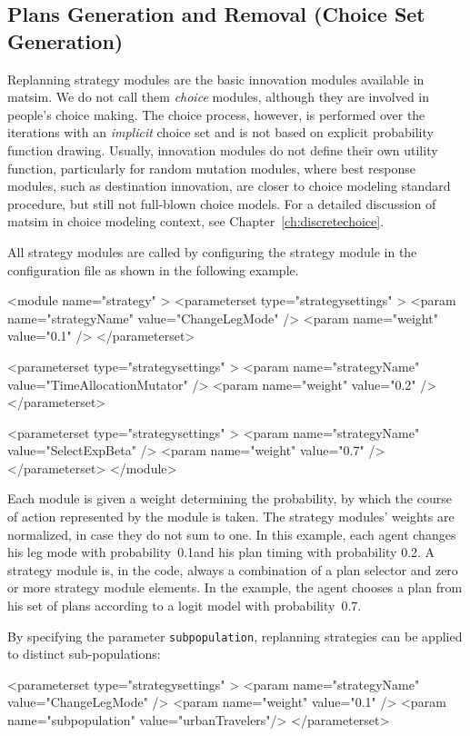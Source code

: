 \subsection{Plans Generation and Removal (Choice Set Generation)}

Replanning strategy modules are the basic innovation modules available in \gls{matsim}. We do not call them \emph{choice} modules, although they are involved in people's choice making. The choice process, however, is performed over the iterations with an \emph{implicit} choice set and is not based on explicit probability function drawing. Usually, innovation modules do not define their own utility function,  particularly for random mutation modules, where best response modules, such as destination innovation, are closer to choice modeling standard procedure, but still not full-blown choice models. For a detailed discussion of \gls{matsim} in choice modeling context, see Chapter~\ref{ch:discretechoice}.

All strategy modules are called by configuring the strategy module in the configuration file as shown in the following example.
%
\begin{xml}
<module name="strategy" >
	<parameterset type="strategysettings" >
		<param name="strategyName" value="ChangeLegMode" />
		<param name="weight" value="0.1" />
	</parameterset>
	
	<parameterset type="strategysettings" >
		<param name="strategyName" value="TimeAllocationMutator" />
		<param name="weight" value="0.2" />
	</parameterset>
	
	<parameterset type="strategysettings" >
		<param name="strategyName" value="SelectExpBeta" />
		<param name="weight" value="0.7" />
	</parameterset>
</module>
\end{xml}
%
Each module is given a weight determining the probability, by which the course of action represented by the module is taken. The strategy modules' weights are normalized, in case they do not sum to one. In this example, each agent changes his leg mode with probability~0.1and his plan timing with probability 0.2. A strategy module is, in the code, always a combination of a plan selector and zero or more strategy module elements. In the example, the agent chooses a plan from his set of plans according to a logit model with probability~0.7. 

By specifying the parameter \lstinline|subpopulation|, replanning strategies can be applied to distinct sub-populations: \eg
\begin{xml}
	<parameterset type="strategysettings" >
		<param name="strategyName" value="ChangeLegMode" />
		<param name="weight" value="0.1" />
		<param name="subpopulation" value="urbanTravelers"/>
	</parameterset>
\end{xml}

